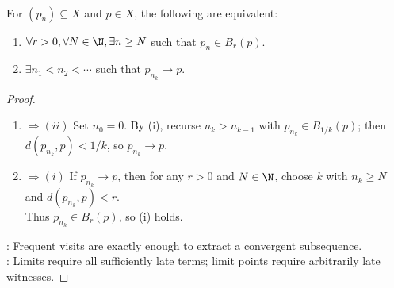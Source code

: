 \begin{proposition} \label{prop:sequence-limit-points-subsequential-limits} \\
For $(p_n)\subseteq X$ and $p\in X$, the following are equivalent:
\begin{enumerate}[label=(\roman*)]
\setlength{\itemsep}{0pt}
\item $\forall r>0,\forall N\in\N,\exists n\geq N$ such that $p_n\in B_r(p)$.
\item $\exists n_1<n_2<\cdots$ such that $p_{n_k}\to p$.
\end{enumerate}
\begin{proof}
\begin{enumerate}[label=\roman*.]
\setlength{\itemsep}{0pt}
\item[$(i)$]$\Rightarrow(ii)$ Set $n_0=0$. By (i), recurse $n_k>n_{k-1}$ with $p_{n_k}\in B_{1/k}(p)$; then $d(p_{n_k},p)<1/k$, so $p_{n_k}\to p$.
\item[$(ii)$]$\Rightarrow(i)$ If $p_{n_k}\to p$, then for any $r>0$ and $N\in\N$, choose $k$ with $n_k\geq N$ and $d(p_{n_k},p)<r$.\\
Thus $p_{n_k}\in B_r(p)$, so (i) holds.
\end{enumerate}
: Frequent visits are exactly enough to extract a convergent subsequence.\\
: Limits require all sufficiently late terms; limit points require arbitrarily late witnesses.
\end{proof}
\end{proposition}

